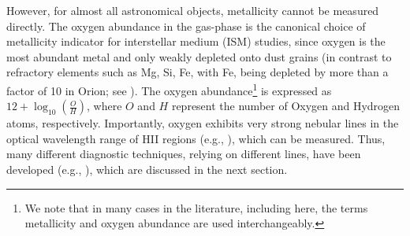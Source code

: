 \documentclass{emulateapj}
\newcommand{\oxab}{\ensuremath{12 + \log_{10}(\frac{O}{H})}}
\begin{document}
However, for almost all astronomical objects, metallicity cannot be measured directly. The oxygen abundance in the gas-phase is the canonical choice of metallicity indicator for interstellar medium (ISM) studies, since oxygen is the most abundant metal and only weakly depleted onto dust grains (in contrast to refractory elements such as Mg, Si, Fe, with Fe, being depleted by more than a factor of 10 in Orion; see \citealt{simondiaz11-orion}). The oxygen abundance\footnote{We note that in many cases in the literature, including here, the terms metallicity and oxygen abundance are used interchangeably.} is expressed as  \oxab, where $O$ and $H$ represent the number of Oxygen and Hydrogen atoms, respectively. 
Importantly, oxygen exhibits very strong nebular lines in the optical wavelength range of HII regions (e.g., \citealt{pagel79,osterbrock89,tremonti04}), which can be measured. 
Thus, many different diagnostic techniques, relying on different lines, have been developed (e.g., \citealt{kewley02,pettini04,kobulnicky04,kewley08}), which are discussed in the next section.
\end{document}
